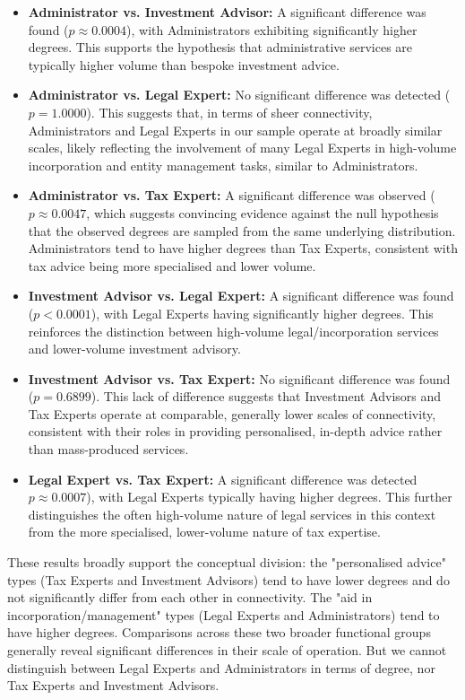 \begin{itemize}
    \item \textbf{Administrator vs. Investment Advisor:} A significant difference was found ($p \approx 0.0004$), with Administrators exhibiting significantly higher degrees. This supports the hypothesis that administrative services are typically higher volume than bespoke investment advice.
    \item \textbf{Administrator vs. Legal Expert:} No significant difference was detected ($p = 1.0000$). This suggests that, in terms of sheer connectivity, Administrators and Legal Experts in our sample operate at broadly similar scales, likely reflecting the involvement of many Legal Experts in high-volume incorporation and entity management tasks, similar to Administrators.
    \item \textbf{Administrator vs. Tax Expert:} A significant difference was observed ($p \approx 0.0047$, which suggests convincing evidence against the null hypothesis that the observed degrees are sampled from the same underlying distribution. Administrators tend to have higher degrees than Tax Experts, consistent with tax advice being more specialised and lower volume.
    \item \textbf{Investment Advisor vs. Legal Expert:} A significant difference was found ($p < 0.0001$), with Legal Experts having significantly higher degrees. This reinforces the distinction between high-volume legal/incorporation services and lower-volume investment advisory.
    \item \textbf{Investment Advisor vs. Tax Expert:} No significant difference was found ($p = 0.6899$). This lack of difference suggests that Investment Advisors and Tax Experts operate at comparable, generally lower scales of connectivity, consistent with their roles in providing personalised, in-depth advice rather than mass-produced services. 
    \item \textbf{Legal Expert vs. Tax Expert:} A significant difference was detected $p \approx 0.0007$), with Legal Experts typically having higher degrees. This further distinguishes the often high-volume nature of legal services in this context from the more specialised, lower-volume nature of tax expertise.
\end{itemize}

These results broadly support the conceptual division: the "personalised advice" types (Tax Experts and Investment Advisors) tend to have lower degrees and do not significantly differ from each other in connectivity. The "aid in incorporation/management" types (Legal Experts and Administrators) tend to have higher degrees. Comparisons across these two broader functional groups generally reveal significant differences in their scale of operation. But we cannot distinguish between Legal Experts and Administrators in terms of degree, nor Tax Experts and Investment Advisors.

